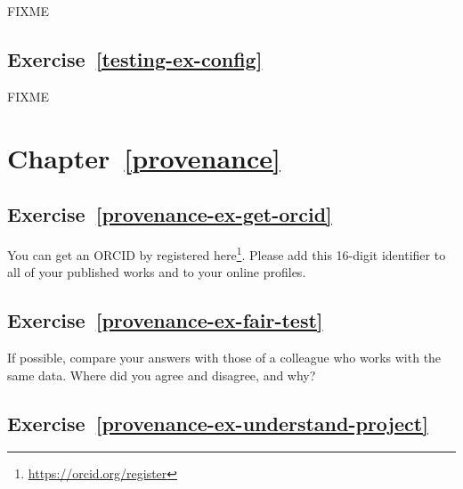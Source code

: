 \documentclass[
]{krantz}
\renewcommand{\href}[2]{#2\footnote{\url{#1}}}
\begin{document}
FIXME

\hypertarget{exercise-reftesting-ex-config}{%
\subsection*{Exercise~\ref{testing-ex-config}}\label{exercise-reftesting-ex-config}}


FIXME

\hypertarget{chapter-refprovenance}{%
\section*{Chapter~\ref{provenance}}\label{chapter-refprovenance}}

\hypertarget{exercise-refprovenance-ex-get-orcid}{%
\subsection*{Exercise~\ref{provenance-ex-get-orcid}}\label{exercise-refprovenance-ex-get-orcid}}


You can get an ORCID by registered \href{https://orcid.org/register}{here}.
Please add this 16-digit identifier to all of your published works
and to your online profiles.

\hypertarget{exercise-refprovenance-ex-fair-test}{%
\subsection*{Exercise~\ref{provenance-ex-fair-test}}\label{exercise-refprovenance-ex-fair-test}}


If possible,
compare your answers with those of a colleague who works with the same data.
Where did you agree and disagree, and why?

\hypertarget{exercise-refprovenance-ex-understand-project}{%
\subsection*{Exercise~\ref{provenance-ex-understand-project}}\label{exercise-refprovenance-ex-understand-project}}
\end{document}
